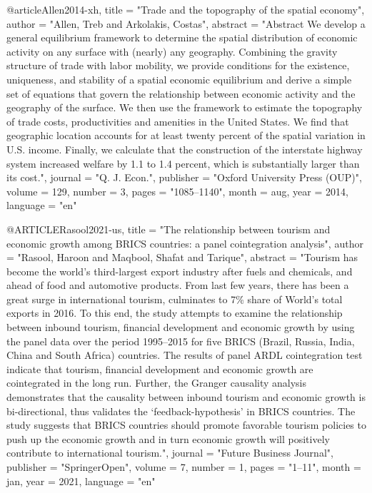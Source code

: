 @article{Allen2014-xh,
	title     = "Trade and the topography of the spatial economy",
	author    = "Allen, Treb and Arkolakis, Costas",
	abstract  = "Abstract We develop a general equilibrium framework to determine
	the spatial distribution of economic activity on any surface
	with (nearly) any geography. Combining the gravity structure of
	trade with labor mobility, we provide conditions for the
	existence, uniqueness, and stability of a spatial economic
	equilibrium and derive a simple set of equations that govern the
	relationship between economic activity and the geography of the
	surface. We then use the framework to estimate the topography of
	trade costs, productivities and amenities in the United States.
	We find that geographic location accounts for at least twenty
	percent of the spatial variation in U.S. income. Finally, we
	calculate that the construction of the interstate highway system
	increased welfare by 1.1 to 1.4 percent, which is substantially
	larger than its cost.",
	journal   = "Q. J. Econ.",
	publisher = "Oxford University Press (OUP)",
	volume    =  129,
	number    =  3,
	pages     = "1085--1140",
	month     =  aug,
	year      =  2014,
	language  = "en"
}

@ARTICLE{Rasool2021-us,
	title     = "The relationship between tourism and economic growth among
	{BRICS} countries: a panel cointegration analysis",
	author    = "Rasool, Haroon and Maqbool, Shafat and {Tarique}",
	abstract  = "Tourism has become the world's third-largest export industry
	after fuels and chemicals, and ahead of food and automotive
	products. From last few years, there has been a great surge in
	international tourism, culminates to 7\% share of World's total
	exports in 2016. To this end, the study attempts to examine the
	relationship between inbound tourism, financial development and
	economic growth by using the panel data over the period
	1995--2015 for five BRICS (Brazil, Russia, India, China and
	South Africa) countries. The results of panel ARDL cointegration
	test indicate that tourism, financial development and economic
	growth are cointegrated in the long run. Further, the Granger
	causality analysis demonstrates that the causality between
	inbound tourism and economic growth is bi-directional, thus
	validates the `feedback-hypothesis' in BRICS countries. The
	study suggests that BRICS countries should promote favorable
	tourism policies to push up the economic growth and in turn
	economic growth will positively contribute to international
	tourism.",
	journal   = "Future Business Journal",
	publisher = "SpringerOpen",
	volume    =  7,
	number    =  1,
	pages     = "1--11",
	month     =  jan,
	year      =  2021,
	language  = "en"
}

